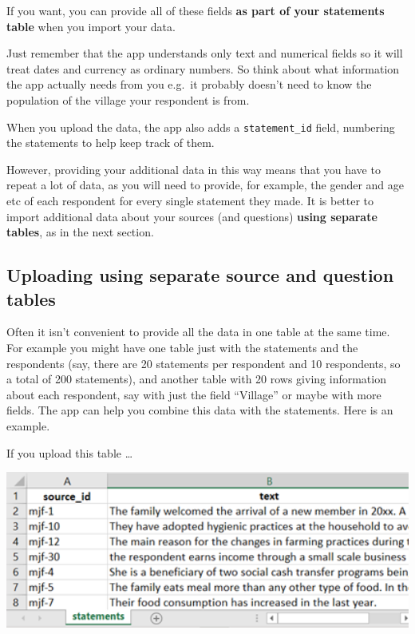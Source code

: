 \documentclass[
]{book}
\begin{document}
If you want, you can provide all of these fields \textbf{as part of your statements table} when you import your data.

Just remember that the app understands only text and numerical fields so it will treat dates and currency as ordinary numbers. So think about what information the app actually needs from you e.g.~it probably doesn't need to know the population of the village your respondent is from.

When you upload the data, the app also adds a \texttt{statement\_id} field, numbering the statements to help keep track of them.

However, providing your additional data in this way means that you have to repeat a lot of data, as you will need to provide, for example, the gender and age etc of each respondent for every single statement they made. It is better to import additional data about your sources (and questions) \textbf{using separate tables}, as in the next section.

\hypertarget{uploading-using-separate-source-and-question-tables}{%
\subsection{Uploading using separate source and question tables}\label{uploading-using-separate-source-and-question-tables}}

Often it isn't convenient to provide all the data in one table at the same time. For example you might have one table just with the statements and the respondents (say, there are 20 statements per respondent and 10 respondents, so a total of 200 statements), and another table with 20 rows giving information about each respondent, say with just the field ``Village'' or maybe with more fields. The app can help you combine this data with the statements. Here is an example.

If you upload this table \ldots{}

\includegraphics[width=6.77083in,height=\textheight]{_assets/image-20211019095700443.png}
\end{document}
